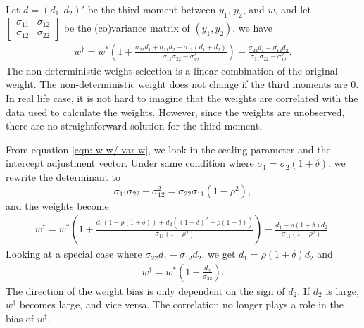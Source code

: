 \documentclass[11pt]{article}
\begin{document}
Let \(d = (d_1, d_2)'\) be the third moment between \(y_1\), \(y_2\), and $w$,
and let
\(\begin{bmatrix} \sigma_{11} & \sigma_{12}\\ \sigma_{12} & \sigma_{22}\end{bmatrix}\)
be the (co)variance matrix of $(y_1,y_2)$, we have
\begin{equation}
\label{eqn: w w/ var w}
\begin{aligned}
w^\dagger = w^*(1+\frac{\sigma_{22} d_1 + \sigma_{11} d_2 -\sigma_{12} (d_1 + d_2)}{\sigma_{11}\sigma_{22} - \sigma_{12}^2}) - \frac{\sigma_{22} d_1 - \sigma_{12}d_2}{\sigma_{11}\sigma_{22} - \sigma_{12}^2}.
\end{aligned}
\end{equation}
The non-deterministic weight selection is a linear combination of the
original weight. The non-deterministic weight does not change if the
third moments are \(0\). 
In real life case, it is not hard to imagine that the weights are correlated with the data used to calculate the weights. However, since the weights are unobserved, there are no straightforward solution for the third moment.

From equation \ref{eqn: w w/ var w}, we look in the scaling parameter
and the intercept adjustment vector. Under same condition where
\(\sigma_1 =\sigma_2 (1 + \delta)\), we rewrite the determinant to
\begin{equation}
\sigma_{11}\sigma_{22} - \sigma_{12}^2 = \sigma_{22}\sigma_{11} (1- \rho^2),
\end{equation}
and the weights become
\begin{equation}
\label{eqn: scaling factors}
\begin{aligned}
w^\dagger = w^*(1+\frac{d_1(1- \rho(1+\delta)) + d_2 ((1+\delta)^2-\rho(1+\delta))} {\sigma_{11} (1- \rho^2)}) - \frac{d_1-\rho(1+\delta) d_2}{\sigma_{11}(1- \rho^2)}.
\end{aligned}
\end{equation}
Looking at a special case where $\sigma_{22} d_1 - \sigma_{12}d_2$, we get $d_1=\rho(1+\delta) d_2$ and 
\begin{equation}
\label{eqn: special case}
\begin{aligned}
w^\dagger = w^*(1+\frac{d_2} {\sigma_{22}}).
\end{aligned}
\end{equation}
The direction of the weight bias is only dependent on the sign of $d_2$. If $d_2$ is large, $w^\dagger$ becomes large, and vice versa. The correlation no longer plays a role in the bias of $w^\dagger$.
\end{document}

